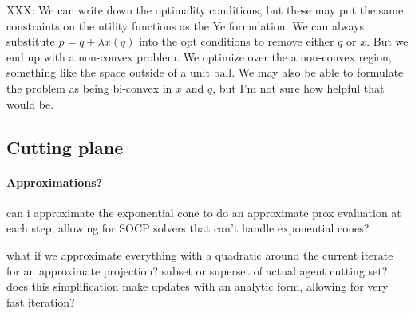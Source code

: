 \documentclass[12pt]{article}
\begin{document}
XXX: We can write down the optimality conditions, but these may put the same
constraints on the utility functions as the Ye formulation. We can always
substitute $p = q + \lambda x(q)$ into the opt conditions to remove either
$q$ or $x$. But we end up with a non-convex problem. We optimize over the a
non-convex region, something like the space outside of a unit ball.
We may also be able to formulate the problem as being bi-convex in $x$ and $q$,
but I'm not sure how helpful that would be.

\subsection{Cutting plane}
\paragraph{Approximations?}
can i approximate the exponential cone to do an approximate prox evaluation
at each step, allowing for SOCP solvers that can't handle exponential cones?

what if we approximate everything with a quadratic around the current iterate
for an approximate projection? subset or superset of actual agent cutting set?
does this simplification make updates with an analytic form, allowing for very
fast iteration?



\newpage


\end{document}
